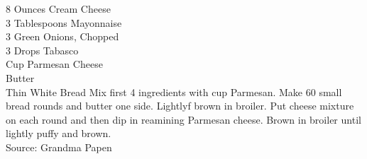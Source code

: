 {8 Ounces Cream Cheese \\
 3 Tablespoons Mayonnaise \\
 3 Green Onions, Chopped \\
 3 Drops Tabasco \\
  Cup Parmesan Cheese \\
 Butter \\
 Thin White Bread}
{Mix first 4 ingredients with  cup Parmesan. Make 60 small bread rounds and butter one side. Lightlyf brown in broiler. Put cheese mixture on each round and then dip in reamining Parmesan cheese. Brown in broiler until lightly puffy and brown. \\
Source: Grandma Papen}
